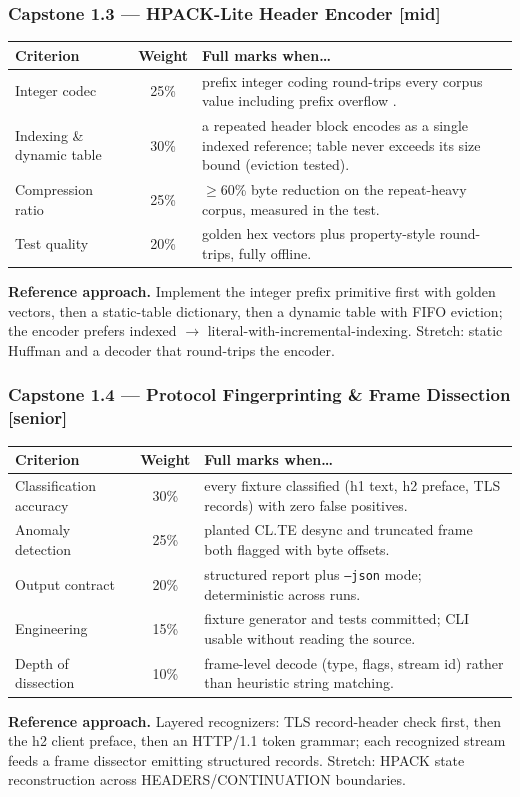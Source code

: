 \subsubsection*{Capstone 1.3 --- HPACK-Lite Header Encoder [mid]}
\begin{center}\small
\begin{tabularx}{\textwidth}{l c X}
\toprule
\textbf{Criterion} & \textbf{Weight} & \textbf{Full marks when\ldots} \\
\midrule
Integer codec & 25\% & prefix integer coding round-trips every corpus value including prefix overflow \cite{rfc7541}. \\
Indexing \& dynamic table & 30\% & a repeated header block encodes as a single indexed reference; table never exceeds its size bound (eviction tested). \\
Compression ratio & 25\% & $\geq$60\% byte reduction on the repeat-heavy corpus, measured in the test. \\
Test quality & 20\% & golden hex vectors plus property-style round-trips, fully offline. \\
\bottomrule
\end{tabularx}
\end{center}
\textbf{Reference approach.} Implement the integer prefix primitive first
with golden vectors, then a static-table dictionary, then a dynamic table
with FIFO eviction; the encoder prefers indexed $\to$
literal-with-incremental-indexing. Stretch: static Huffman and a decoder
that round-trips the encoder.

\subsubsection*{Capstone 1.4 --- Protocol Fingerprinting \& Frame Dissection [senior]}
\begin{center}\small
\begin{tabularx}{\textwidth}{l c X}
\toprule
\textbf{Criterion} & \textbf{Weight} & \textbf{Full marks when\ldots} \\
\midrule
Classification accuracy & 30\% & every fixture classified (h1 text, h2 preface, TLS records) with zero false positives. \\
Anomaly detection & 25\% & planted CL.TE desync and truncated frame both flagged with byte offsets. \\
Output contract & 20\% & structured report plus \texttt{--json} mode; deterministic across runs. \\
Engineering & 15\% & fixture generator and tests committed; CLI usable without reading the source. \\
Depth of dissection & 10\% & frame-level decode (type, flags, stream id) rather than heuristic string matching. \\
\bottomrule
\end{tabularx}
\end{center}
\textbf{Reference approach.} Layered recognizers: TLS record-header check
first, then the h2 client preface, then an HTTP/1.1 token grammar; each
recognized stream feeds a frame dissector emitting structured records.
Stretch: HPACK state reconstruction across HEADERS/CONTINUATION boundaries.

